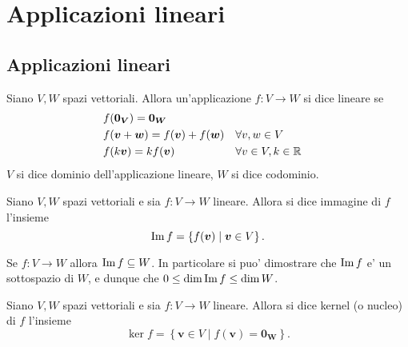 \chapter{Applicazioni lineari}

\section{Applicazioni lineari}

\begin{definition}
    Siano $V, W$ spazi vettoriali. Allora un'applicazione $f : V \to W$ si dice lineare
    se
    \begin{align}
        &f(\bm{0_V}) = \bm{0_W} \\
        &f(\bm{v} + \bm{w}) = f(\bm{v}) + f(\bm{w}) &&\forall v, w \in V \\
        &f(k\bm{v}) = kf(\bm{v})                    &&\forall v\in V, k \in \mathbb{R} 
    \end{align}
    $V$ si dice dominio dell'applicazione lineare, $W$ si dice codominio.
\end{definition}

\begin{definition}
    Siano $V, W$ spazi vettoriali e sia $f : V \to W$ lineare. Allora si dice immagine di $f$ l'insieme \begin{equation}
        \operatorname{Im}f = \left\{ f(\bm{v}) \mid \bm v \in V\right\}.
    \end{equation}
\end{definition}

\begin{remark}
    Se $f : V \to W$ allora $\operatorname{Im}f \subseteq W$. In particolare si puo' dimostrare che $\operatorname{Im}f$ e' un sottospazio di $W$, e dunque che $0 \leq \dim\operatorname{Im}f \leq \dim W$.
\end{remark}

\begin{definition}
    Siano $V, W$ spazi vettoriali e sia $f : V \to W$ lineare. Allora si dice kernel (o nucleo) di $f$ l'insieme \begin{equation}
        \ker{f} = \left\{ \bm{v} \in V \mid f(\bm v) = \bm{0_W}\right\}.
    \end{equation}
\end{definition}

